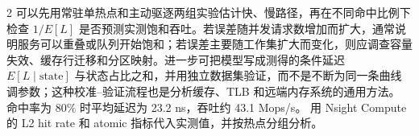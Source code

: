 \begin{solutionexercise}{2}
可以先用常驻单热点和主动驱逐两组实验估计快、慢路径，再在不同命中比例下检查 $1/E[L]$ 是否预测实测饱和吞吐。若误差随并发请求数增加而扩大，通常说明服务可以重叠或队列开始饱和；若误差主要随工作集扩大而变化，则应调查容量失效、缓存行迁移和分区映射。进一步可把模型写成测得的条件延迟 $E[L\mid\text{state}]$ 与状态占比之和，并用独立数据集验证，而不是不断为同一条曲线调参数；这种校准--验证流程也是分析缓存、TLB 和远端内存系统的通用方法。
\variantheading 命中率为 $80\%$ 时平均延迟为 23.2 ns，吞吐约 43.1 Mops/s。
\practiceheading 用 Nsight Compute 的 L2 hit rate 和 atomic 指标代入实测值，并按热点分组分析。
\end{solutionexercise}

